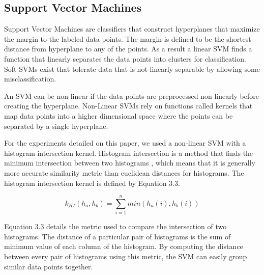 \subsection*{Support Vector Machines}

Support Vector Machines are classifiers that construct hyperplanes that maximize the margin 
to the labeled data points. The margin is defined to be the shortest distance from hyperplane 
to any of the points. As a result a linear SVM finds a function that linearly separates the data
points into clusters for classification. Soft SVMs exist that tolerate data that is not linearly separable by allowing
some misclassification. 

An SVM can be non-linear if the data points are  preprocessed non-linearly before creating the hyperplane. 
Non-Linear SVMs rely on functions called kernels that map data points into a higher dimensional space where
the points can be separated by a single hyperplane. 

For the experiments detailed on this paper, we used a non-linear SVM with a histogram intersection kernel.
Histogram intersection is a method that finds the minimum intersection between two histograms \cite{maji2008classification}, which means 
that it is generally more accurate similarity metric than euclidean distances for histograms.  The histogram intersection kernel is 
defined by Equation 3.3.

\begin{equation}
k_{HI}(h_a,h_b) = \sum_{i = 1}^n min(h_a(i),h_b(i))
\end{equation}

Equation 3.3 details the metric used to compare the intersection of two histograms. The distance of a particular 
pair of histograms is the sum of minimum value of each column of the histogram.  By computing the distance between 
every pair of histograms using this metric, the SVM can easily group similar data points together. 

